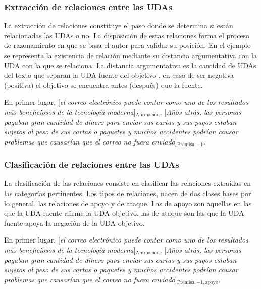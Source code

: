 \documentclass[a4paper,11pt,twocolumn,twoside]{article}
\begin{document}
\subsubsection{Extracción de relaciones entre las UDAs}

La extracción de relaciones constituye el paso donde se determina si están relacionadas las UDAs o no. 
La disposición de estas relaciones forma el proceso de razonamiento en que se basa el autor para validar 
su posición. En el ejemplo se representa la existencia de relación mediante su distancia argumentativa con 
la UDA con la que se relaciona. La distancia argumentativa es la cantidad de UDAs del texto que separan la 
UDA fuente del objetivo \cite{galassi2021deep}, en caso de ser negativa (positiva) el objetivo se encuentra 
antes (después) que la fuente.

\begin{adjustwidth}{25pt}{25pt}
	En primer lugar, [\textit{el correo electrónico puede contar como uno de los resultados
				más beneficiosos de la tecnología moderna}]$_{\mathrm{\text{Afirmación}}}$. [\textit{Años atrás, las personas pagaban gran cantidad de dinero para
				enviar sus cartas y sus pagos estaban sujetos al peso de sus cartas o paquetes y muchos accidentes podrían 
				causar problemas que causarían que el correo no fuera enviado}]$_{\mathrm{Premisa, -1}}$.
\end{adjustwidth}

\subsubsection{Clasificación de relaciones entre las UDAs}

La clasificación de las relaciones consiste en clasificar las relaciones extraídas en las categorías pertinentes.
Los tipos de relaciones, nacen de dos clases bases por lo general, las relaciones de apoyo y de ataque.
Las de apoyo son aquellas en las que la UDA fuente afirme la UDA objetivo, las de ataque son 
las que la UDA fuente apoya la negación de la UDA objetivo.

\begin{adjustwidth}{25pt}{25pt}
	En primer lugar, [\textit{el correo electrónico puede contar como uno de los resultados
				más beneficiosos de la tecnología moderna}]$_{\mathrm{\text{Afirmación}}}$. [\textit{Años atrás, las personas pagaban gran cantidad de dinero para
				enviar sus cartas y sus pagos estaban sujetos al peso de sus cartas o paquetes y muchos accidentes podrían 
				causar problemas que causarían que el correo no fuera enviado}]$_{\mathrm{Premisa, -1, apoyo}}$.
\end{adjustwidth}
\end{document}
